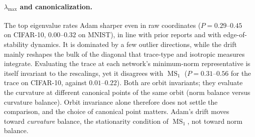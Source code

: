 \documentclass[10pt]{article}
\theoremstyle{remark}
\newcommand{\MS}{\operatorname{MS}}
\begin{document}
\paragraph{$\lambda_{\max}$ and canonicalization.} The top eigenvalue rates Adam sharper even in raw coordinates ($P=0.29$--$0.45$ on CIFAR-10, $0.00$--$0.32$ on MNIST), in line with prior reports and with edge-of-stability dynamics. It is dominated by a few outlier directions, while the drift mainly reshapes the bulk of the diagonal that trace-type and isotropic measures integrate. Evaluating the trace at each network's minimum-norm representative is itself invariant to the rescalings, yet it disagrees with $\MS_1$ ($P=0.31$--$0.56$ for the trace on CIFAR-10, against $0.01$--$0.22$). Both are orbit invariants; they evaluate the curvature at different canonical points of the same orbit (norm balance versus curvature balance). Orbit invariance alone therefore does not settle the comparison, and the choice of canonical point matters. Adam's drift moves toward \emph{curvature} balance, the stationarity condition of $\MS_1$, not toward norm balance.
\end{document}
